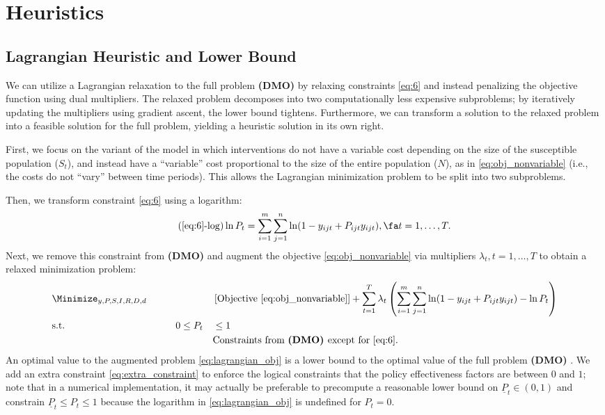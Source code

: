 \documentclass{article}
\newcommand{\model}{{\bf (DMO) }}
\begin{document}
\section{Heuristics}

\subsection{Lagrangian Heuristic and Lower Bound}\label{sec:lagrangian}

We can utilize a Lagrangian relaxation to the full problem \model by relaxing constraints \eqref{eq:6} and instead penalizing the objective function using dual multipliers. The relaxed problem decomposes into two computationally less expensive subproblems; by iteratively updating the multipliers using gradient ascent, the lower bound tightens. Furthermore, we can transform a solution to the relaxed problem into a feasible solution for the full problem, yielding a heuristic solution in its own right.

First, we focus on the variant of the model in which interventions do not have a variable cost depending on the size of the susceptible population ($S_t$), and instead have a ``variable'' cost proportional to the size of the entire population ($N$), as in \eqref{eq:obj_nonvariable} (i.e., the costs do not ``vary'' between time periods). This allows the Lagrangian minimization problem to be split into two subproblems.

Then, we transform constraint \eqref{eq:6} using a logarithm:
\begin{equation}\label{eq:6log}\tag{\ref{eq:6}-$\log$}
    \ln P_t = \sum_{i=1}^{m}\sum_{j=1}^{n} \ln (1-y_{ijt} + P_{ijt} y_{ijt}), \fa t=1,\ldots,T.
\end{equation}
Next, we remove this constraint from \model and augment the objective \eqref{eq:obj_nonvariable} via multipliers $\lambda_t,t=1,\ldots,T$ to obtain a relaxed minimization problem:
{\small
    \begin{alignat}{4}
        &\Minimize_{y,P,S,I,R,D,d}\qquad &&&& \left[\text{Objective \eqref{eq:obj_nonvariable}}\right] + \sum_{t=1}^{T}\lambda_t \left(\sum_{i=1}^{m}\sum_{j=1}^{n} \ln (1-y_{ijt} + P_{ijt} y_{ijt})- \ln P_t\right)\label{eq:lagrangian_obj}\\
        &  \text{s.t.} && 0 \le P_t &&\le 1 \label{eq:extra_constraint}\\
        &   &&  &&\text{Constraints from \model except for \eqref{eq:6}.}\nonumber
    \end{alignat}
}
An optimal value to the augmented problem \eqref{eq:lagrangian_obj} is a lower bound to the optimal value of the full problem \model. We add an extra constraint \eqref{eq:extra_constraint} to enforce the logical constraints that the policy effectiveness factors are between $0$ and $1$; note that in a numerical implementation, it may actually be preferable to precompute a reasonable lower bound on $\underline{P}_t \in (0,1)$ and constrain $\underline{P}_t \le P_t \le 1$ because the logarithm in \eqref{eq:lagrangian_obj} is undefined for $P_t=0$.
\end{document}
